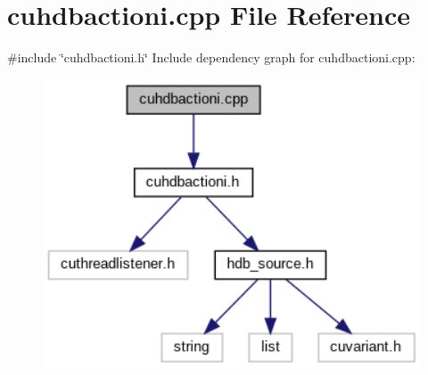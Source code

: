 \section{cuhdbactioni.\+cpp File Reference}
\label{cuhdbactioni_8cpp}
{\ttfamily \#include \char`\"{}cuhdbactioni.\+h\char`\"{}}\newline
Include dependency graph for cuhdbactioni.\+cpp\+:
\nopagebreak
\begin{figure}[H]
\begin{center}
\leavevmode
\includegraphics[width=325pt]{cuhdbactioni_8cpp__incl}
\end{center}
\end{figure}
